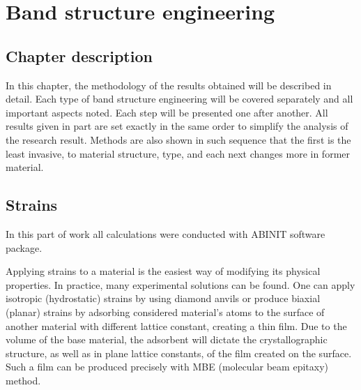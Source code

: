 \chapter{Band structure engineering}
\label{chap:methods}
\section*{Chapter description}

In this chapter, the methodology of the results obtained will be described in detail.
Each type of band structure engineering will be covered separately and all important aspects noted.
Each step will be presented one after another.
All results given in part \hyperref[part:III]{} are set exactly in the same order to simplify the analysis of the research result.
Methods are also shown in such sequence that the first is the least invasive, to material structure, type, and each next changes more in former material.
\ornament
\section{Strains}
\label{sect:strain_theory}

In this part of work all calculations were conducted with ABINIT software package.

Applying strains to a material is the easiest way of modifying its physical properties.
In practice, many experimental solutions can be found.
One can apply isotropic (hydrostatic) strains by using diamond anvils or produce biaxial (planar) strains by adsorbing considered material's atoms to the surface of another material with different lattice constant, creating a thin film.
Due to the volume of the base material, the adsorbent will dictate the crystallographic structure, as well as in plane lattice constants, of the film created on the surface.
Such a film can be produced precisely with MBE (molecular beam epitaxy) method.

